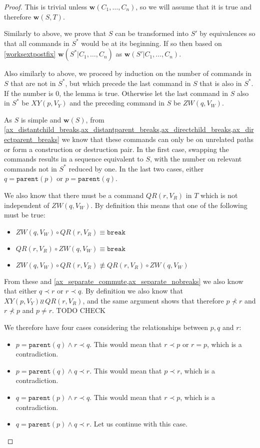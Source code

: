 \documentclass[12pt]{article}
\newcommand{\parent}{\mathtt{parent}}
\newcommand{\cbrk}{\mathtt{break}}
\newcommand{\fscommand}[2]{{#1#2}}
\newcommand{\cxy}{\fscommand{X}{Y}}
\newcommand{\czw}{\fscommand{Z}{W}}
\newcommand{\cqr}{\fscommand{Q}{R}}
\newcommand{\cc}{\circ} %
\newcommand{\descendant}{\prec}
\newcommand{\nequiv}{\not\equiv}
\newcommand{\indep}{\wr\!\!\wr\,} %
\newcommand{\works}[1]{{\mathbf{w}}({#1})}
\newcommand{\worksc}[2]{{\mathbf{w}}({#1}|{#2})}
\theoremstyle{definition}
\begin{document}
\begin{proof}
This is trivial unless $\works{C_1,\ldots,C_n}$, so we will assume that it is true
and therefore $\works{S,T}$.

Similarly to above, we prove that $S$ can be transformed into $S'$ by equivalences
so that all commands in $S^*$ would be at its beginning.
If so then based on \cref{worksextpostfix}
$\worksc{S^*}{C_1,\ldots,C_n}$ as $\worksc{S'}{C_1,\ldots,C_n}$.

Also similarly to above,
we proceed by induction on the number of commands in $S$ that are not in $S^*$, but which precede
the last command in $S$ that is also in $S^*$.
If the number is 0, the lemma is true.
Otherwise let the last command in $S$ also in $S^*$ be $\cxy(p,V_Y)$
and the preceding command in $S$ be $\czw(q,V_W)$.

As $S$ is simple and $\works{S}$, from 
\cref{ax_distantchild_breaks,ax_distantparent_breaks,ax_directchild_breaks,ax_directparent_breaks}
we know that these commands can only be on unrelated paths or form a construction or destruction pair.
In the first case, swapping the commands results in a sequence equivalent to $S$,
with the number on relevant commands not in $S^*$ reduced by one.
In the last two cases,
either $q=\parent(p)$ or $p=\parent(q)$.

We also know that there must be a command $\cqr(r,V_R)$ in $T$ which is not independent of $\czw(q,V_W)$.
By definition this means that one of the following must be true:
\begin{itemize}
\item $\czw(q,V_W)\cc \cqr(r,V_R) \equiv\cbrk$
\item $\cqr(r,V_R)\cc \czw(q,V_W) \equiv\cbrk$
\item $\czw(q,V_W)\cc \cqr(r,V_R) \nequiv \cqr(r,V_R)\cc \czw(q,V_W)$
\end{itemize}
From these and \cref{ax_separate_commute,ax_separate_nobreaks} we also know that
either $q\descendant r$ or $r\descendant q$.
By definition we also know that $\cxy(p,V_Y)\indep \cqr(r,V_R)$,
and the same argument shows that therefore
$p\not\descendant r$ and $r\not\descendant p$ and $p\neq r$. TODO CHECK

We therefore have four cases considering the relationships between $p,q$ and $r$:
\begin{itemize}
\item $p=\parent(q) \wedge r\descendant q$.
   This would mean that $r\descendant p$ or $r=p$, which is a contradiction.
\item $p=\parent(q) \wedge q\descendant r$.
   This would mean that $p\descendant r$, which is a contradiction.
\item $q=\parent(p) \wedge r\descendant q$.
   This would mean that $r\descendant p$, which is a contradiction.  
\item $q=\parent(p) \wedge q\descendant r$.
   Let us continue with this case.
\end{itemize}


\end{proof}
\end{document}
